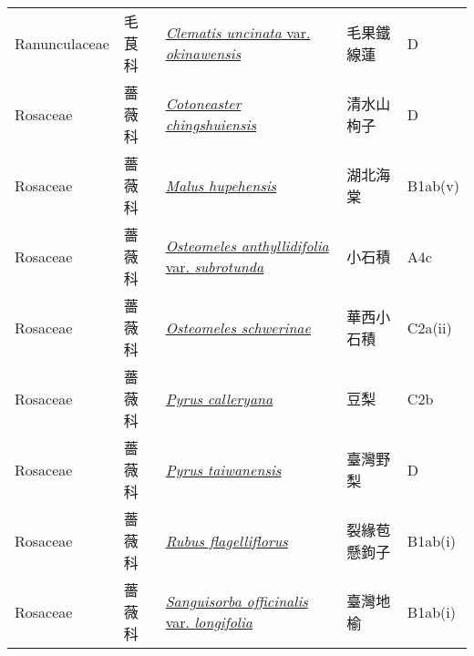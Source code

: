 {\begin{longtable}{p{2.5cm}p{2cm}p{5cm}p{2.5cm}p{3cm}}
    Ranunculaceae & 毛茛科 & \href{http://www.theplantlist.org/tpl1.1/search?q=Clematis+uncinata+var.+okinawensis}{\textit{Clematis uncinata} var. \textit{okinawensis} } & 毛果鐵線蓮 & D \index{Clematis@\textit{Clematis}!uncinata@\textit{uncinata}!var. okinawensis@var. \textit{okinawensis}}  \index{毛果鐵線蓮} \\
    Rosaceae & 薔薇科 & \href{http://www.theplantlist.org/tpl1.1/search?q=Cotoneaster+chingshuiensis}{\textit{Cotoneaster chingshuiensis} } & 清水山栒子 & D \index{Cotoneaster@\textit{Cotoneaster}!chingshuiensis@\textit{chingshuiensis}}  \index{清水山栒子} \\
    Rosaceae & 薔薇科 & \href{http://www.theplantlist.org/tpl1.1/search?q=Malus+hupehensis}{\textit{Malus hupehensis} } & 湖北海棠 & B1ab(v) \index{Malus@\textit{Malus}!hupehensis@\textit{hupehensis}}  \index{湖北海棠} \\
    Rosaceae & 薔薇科 & \href{http://www.theplantlist.org/tpl1.1/search?q=Osteomeles+anthyllidifolia+var.+subrotunda}{\textit{Osteomeles anthyllidifolia} var. \textit{subrotunda} } & 小石積 & A4c \index{Osteomeles@\textit{Osteomeles}!anthyllidifolia@\textit{anthyllidifolia}!var. subrotunda@var. \textit{subrotunda}}  \index{小石積} \\
    Rosaceae & 薔薇科 & \href{http://www.theplantlist.org/tpl1.1/search?q=Osteomeles+schwerinae}{\textit{Osteomeles schwerinae} } & 華西小石積 & C2a(ii) \index{Osteomeles@\textit{Osteomeles}!schwerinae@\textit{schwerinae}}  \index{華西小石積} \\
    Rosaceae & 薔薇科 & \href{http://www.theplantlist.org/tpl1.1/search?q=Pyrus+calleryana}{\textit{Pyrus calleryana} } & 豆梨 & C2b \index{Pyrus@\textit{Pyrus}!calleryana@\textit{calleryana}}  \index{豆梨} \\
    Rosaceae & 薔薇科 & \href{http://www.theplantlist.org/tpl1.1/search?q=Pyrus+taiwanensis}{\textit{Pyrus taiwanensis} } & 臺灣野梨 & D \index{Pyrus@\textit{Pyrus}!taiwanensis@\textit{taiwanensis}}  \index{臺灣野梨} \\
    Rosaceae & 薔薇科 & \href{http://www.theplantlist.org/tpl1.1/search?q=Rubus+flagelliflorus}{\textit{Rubus flagelliflorus} } & 裂緣苞懸鉤子 & B1ab(i) \index{Rubus@\textit{Rubus}!flagelliflorus@\textit{flagelliflorus}}  \index{裂緣苞懸鉤子} \\
    Rosaceae & 薔薇科 & \href{http://www.theplantlist.org/tpl1.1/search?q=Sanguisorba+officinalis+var.+longifolia}{\textit{Sanguisorba officinalis} var. \textit{longifolia} } & 臺灣地榆 & B1ab(i) \index{Sanguisorba@\textit{Sanguisorba}!officinalis@\textit{officinalis}!var. longifolia@var. \textit{longifolia}}  \index{臺灣地榆} \\

\end{longtable}}
